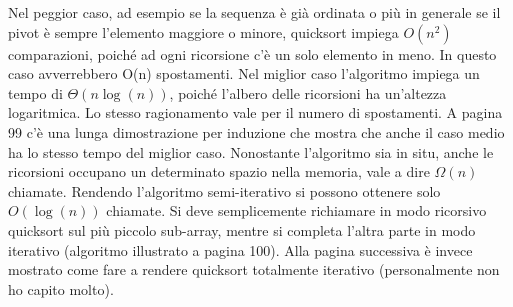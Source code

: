 \documentclass[12pt,a4paper]{book}
\begin{document}
Nel peggior caso, ad esempio se la sequenza è già ordinata o più in generale se il pivot è sempre l'elemento maggiore o minore, quicksort impiega $O(n^2)$ comparazioni, poiché ad ogni ricorsione c'è un solo elemento in meno. In questo caso avverrebbero O(n) spostamenti. Nel miglior caso l'algoritmo impiega un tempo di $\Theta (n\log (n))$, poiché l'albero delle ricorsioni ha un'altezza logaritmica. Lo stesso ragionamento vale per il numero di spostamenti. A pagina 99 c'è una lunga dimostrazione per induzione che mostra che anche il caso medio ha lo stesso tempo del miglior caso. Nonostante l'algoritmo sia in situ, anche le ricorsioni occupano un determinato spazio nella memoria, vale a dire $\Omega (n)$ chiamate. Rendendo l'algoritmo semi-iterativo si possono ottenere solo $O(\log (n))$ chiamate. Si deve semplicemente richiamare in modo ricorsivo quicksort sul più piccolo sub-array, mentre si completa l'altra parte in modo iterativo (algoritmo illustrato a pagina 100). Alla pagina successiva è invece mostrato come fare a rendere quicksort totalmente iterativo (personalmente non ho capito molto). 
            
\end{document}
